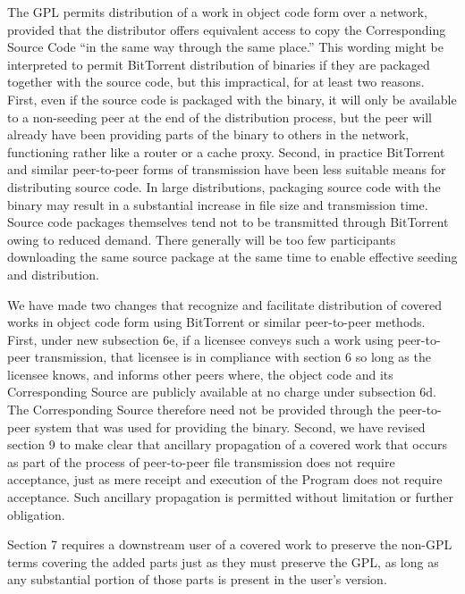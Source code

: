 
The GPL permits distribution of a work in object code form over a network,
provided that the distributor offers equivalent access to copy the
Corresponding Source Code ``in the same way through the same place.''  This
wording might be interpreted to permit BitTorrent distribution of binaries if
they are packaged together with the source code, but this impractical, for at
least two reasons. First, even if the source code is packaged with the
binary, it will only be available to a non-seeding peer at the end of the
distribution process, but the peer will already have been providing parts of
the binary to others in the network, functioning rather like a router or a
cache proxy.  Second, in practice BitTorrent and similar peer-to-peer forms
of transmission have been less suitable means for distributing source code.
In large distributions, packaging source code with the binary may result in a
substantial increase in file size and transmission time.  Source code
packages themselves tend not to be transmitted through BitTorrent owing to
reduced demand. There generally will be too few participants downloading the
same source package at the same time to enable effective seeding and
distribution.


We have made two changes that recognize and facilitate distribution of
covered works in object code form using BitTorrent or similar peer-to-peer
methods.  First, under new subsection 6e, if a licensee conveys such a work
using peer-to-peer transmission, that licensee is in compliance with section
6 so long as the licensee knows, and informs other peers where, the object
code and its Corresponding Source are publicly available at no charge under
subsection 6d.  The Corresponding Source therefore need not be provided
through the peer-to-peer system that was used for providing the binary.
Second, we have revised section 9 to make clear that ancillary propagation of
a covered work that occurs as part of the process of peer-to-peer file
transmission does not require acceptance, just as mere receipt and execution
of the Program does not require acceptance.  Such ancillary propagation is
permitted without limitation or further obligation.



Section 7 requires a downstream user of a covered work to preserve the
non-GPL terms covering the added parts just as they must preserve the GPL, as
long as any substantial portion of those parts is present in the user's
version.

